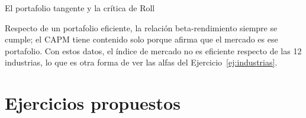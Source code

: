 \begin{ejresuelto}{El portafolio tangente y la crítica de Roll}
\begin{conclusion}
Respecto de un portafolio eficiente, la relación beta-rendimiento siempre se cumple; el CAPM tiene contenido
solo porque afirma que el mercado es ese portafolio. Con estos datos, el índice de mercado no es eficiente
respecto de las 12 industrias, lo que es otra forma de ver las alfas del Ejercicio~\ref{ej:industrias}.
\end{conclusion}
\end{ejresuelto}

\section{Ejercicios propuestos}

